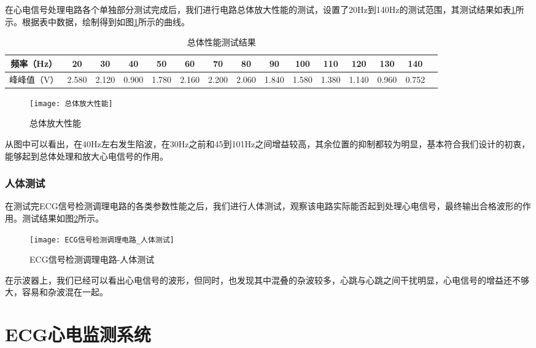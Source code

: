 \documentclass{zjureport}
\begin{document}
	在心电信号处理电路各个单独部分测试完成后，我们进行电路总体放大性能的测试，设置了20Hz到140Hz的测试范围，其测试结果如表\ref{总体性能测试结果}所示。根据表中数据，绘制得到如图\ref{总体放大性能}所示的曲线。
	
	\begin{table}[htbp]
		\centering
		\begin{tabular}{ c|c|c|c|c|c|c|c|c|c|c|c|c|c p{1.5cm}}
			\hline
			频率（Hz） & 20 & 30 & 40 &50 & 60 &70 & 80 &90 & 100 & 110 & 120 &130 & 140 \\
			\hline
			峰峰值（V）  & 2.580 & 2.120 & 0.900 & 1.780 & 2.160 & 2.200 & 2.060 & 1.840 & 1.580 & 1.380 & 1.140 & 0.960 & 0.752 \\
			\hline
		\end{tabular}
		\caption{总体性能测试结果}\label{总体性能测试结果}
	\end{table}

	\begin{figure}[H]
		\centering%
		\texttt{[image: 总体放大性能]}
		\caption{总体放大性能}%
		\label{总体放大性能}%
	\end{figure}

	从图中可以看出，在40Hz左右发生陷波，在30Hz之前和45到101Hz之间增益较高，其余位置的抑制都较为明显，基本符合我们设计的初衷，能够起到总体处理和放大心电信号的作用。
	
	\subsubsection{人体测试}
	
	在测试完ECG信号检测调理电路的各类参数性能之后，我们进行人体测试，观察该电路实际能否起到处理心电信号，最终输出合格波形的作用。测试结果如图\ref{ECG信号检测调理电路_人体测试}所示。
	
	\begin{figure}[H]
		\centering%
		\texttt{[image: ECG信号检测调理电路\_人体测试]}
		\caption{ECG信号检测调理电路-人体测试}%
		\label{ECG信号检测调理电路_人体测试}%
	\end{figure}

	在示波器上，我们已经可以看出心电信号的波形，但同时，也发现其中混叠的杂波较多，心跳与心跳之间干扰明显，心电信号的增益还不够大，容易和杂波混在一起。
	
	\newpage
	
	\section{ECG心电监测系统}
	
\end{document}
